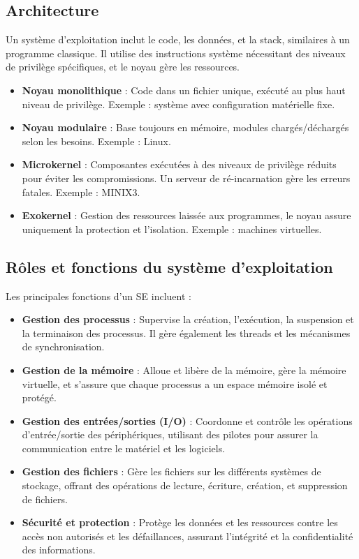 \subsection{Architecture}

Un système d'exploitation inclut le code, les données, et la stack, similaires à un programme classique. Il utilise des instructions système nécessitant des niveaux de privilège spécifiques, et le noyau gère les ressources.

\begin{itemize}
    \item \textbf{Noyau monolithique} : Code dans un fichier unique, exécuté au plus haut niveau de privilège. Exemple : système avec configuration matérielle fixe.
    \item \textbf{Noyau modulaire} : Base toujours en mémoire, modules chargés/déchargés selon les besoins. Exemple : Linux.
    \item \textbf{Microkernel} : Composantes exécutées à des niveaux de privilège réduits pour éviter les compromissions. 
    Un serveur de ré-incarnation gère les erreurs fatales. Exemple : MINIX3.
    \item \textbf{Exokernel} : Gestion des ressources laissée aux programmes, le noyau assure uniquement la protection et l'isolation. Exemple : machines virtuelles.
\end{itemize}


\subsection{Rôles et fonctions du système d'exploitation}
Les principales fonctions d'un SE incluent :
\begin{itemize}
    \item \textbf{Gestion des processus} : Supervise la création, l'exécution, la suspension et la terminaison des processus. 
    Il gère également les threads et les mécanismes de synchronisation.
    \item \textbf{Gestion de la mémoire} : Alloue et libère de la mémoire, gère la mémoire virtuelle, et s'assure que chaque processus a un espace mémoire isolé et protégé.
    \item \textbf{Gestion des entrées/sorties (I/O)} : Coordonne et contrôle les opérations d'entrée/sortie des périphériques, utilisant des pilotes pour assurer la communication entre le matériel et les logiciels.
    \item \textbf{Gestion des fichiers} : Gère les fichiers sur les différents systèmes de stockage, offrant des opérations de lecture, écriture, création, et suppression de fichiers.
    \item \textbf{Sécurité et protection} : Protège les données et les ressources contre les accès non autorisés et les défaillances, assurant l'intégrité et la confidentialité des informations.
\end{itemize}


